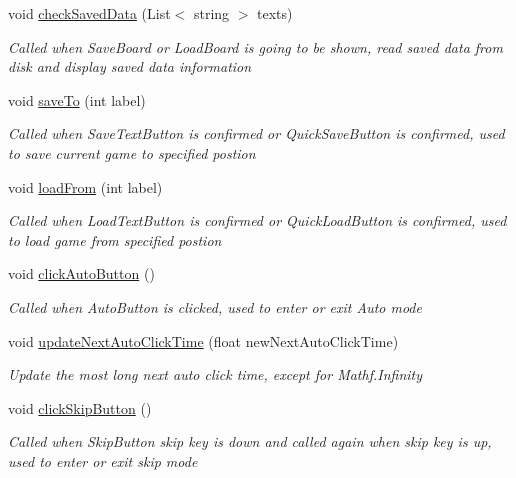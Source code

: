 \begin{DoxyCompactItemize}
void \hyperlink{class_world_control_a99f56eac1a154c36f6339a1d2c9c3559}{check\+Saved\+Data} (List$<$ string $>$ texts)
\begin{DoxyCompactList}\small\item\em Called when Save\+Board or Load\+Board is going to be shown, read saved data from disk and display saved data information \end{DoxyCompactList}\item 
void \hyperlink{class_world_control_ae3a4755061e4d6f6ceedd8f3717e12f4}{save\+To} (int label)
\begin{DoxyCompactList}\small\item\em Called when Save\+Text\+Button is confirmed or Quick\+Save\+Button is confirmed, used to save current game to specified postion \end{DoxyCompactList}\item 
void \hyperlink{class_world_control_ae3a0efa9d79d06955d91c9ce382f8ec0}{load\+From} (int label)
\begin{DoxyCompactList}\small\item\em Called when Load\+Text\+Button is confirmed or Quick\+Load\+Button is confirmed, used to load game from specified postion \end{DoxyCompactList}\item 
void \hyperlink{class_world_control_a5d0501e13fde299e5fb45f78c136a7b2}{click\+Auto\+Button} ()
\begin{DoxyCompactList}\small\item\em Called when Auto\+Button is clicked, used to enter or exit Auto mode \end{DoxyCompactList}\item 
void \hyperlink{class_world_control_a42843cbd7d89325d6fc9b7763b59193c}{update\+Next\+Auto\+Click\+Time} (float new\+Next\+Auto\+Click\+Time)
\begin{DoxyCompactList}\small\item\em Update the most long next auto click time, except for Mathf.\+Infinity \end{DoxyCompactList}\item 
void \hyperlink{class_world_control_aa8f73113a8f3ce8f41d6796099d2a31b}{click\+Skip\+Button} ()
\begin{DoxyCompactList}\small\item\em Called when Skip\+Button skip key is down and called again when skip key is up, used to enter or exit skip mode \end{DoxyCompactList}\item 

\end{DoxyCompactItemize}
